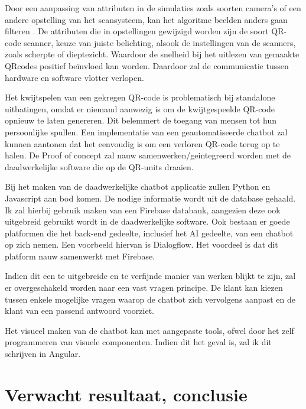 \documentclass[dutch,dit,thesis]{hogentreport}
\begin{document}
Door een aanpassing van attributen in de simulaties zoals soorten camera’s of een andere opstelling van het scansysteem, kan het algoritme beelden anders gaan filteren \autocite{Girisha2022}. De attributen die in opstellingen gewijzigd worden zijn de soort QR-code scanner, keuze van juiste belichting, alsook de instellingen van de scanners, zoals scherpte of dieptezicht. Waardoor de snelheid bij het uitlezen van gemaakte QRcodes positief beïnvloed kan worden. Daardoor zal de communicatie tussen hardware en software vlotter verlopen. 

Het kwijtspelen van een gekregen QR-code is problematisch bij standalone uitbatingen, omdat er niemand aanwezig is om de kwijtgespeelde QR-code opnieuw te laten genereren. Dit belemmert de toegang van mensen tot hun persoonlijke spullen. Een implementatie van een geautomatiseerde chatbot zal kunnen aantonen dat het eenvoudig is om een verloren QR-code terug op te halen. De Proof of concept zal nauw samenwerken/geintegreerd worden met de daadwerkelijke software die op de QR-units draaien.

Bij het maken van de daadwerkelijke chatbot applicatie zullen Python en Javascript aan bod komen. De nodige informatie wordt uit de database gehaald. Ik zal hierbij gebruik maken van een Firebase databank, aangezien deze ook uitgebreid gebruikt wordt in de daadwerkelijke software. Ook bestaan er goede platformen die het back-end gedeelte, inclusief het AI gedeelte, van een chatbot op zich nemen. Een voorbeeld hiervan is Dialogflow. \autocite{Cloud} Het voordeel is dat dit platform nauw samenwerkt met Firebase.

Indien dit een te uitgebreide en te verfijnde manier van werken blijkt te zijn, zal er overgeschakeld worden naar een vast vragen principe. De klant kan kiezen tussen enkele mogelijke vragen waarop de chatbot zich vervolgens aanpast en de klant van een passend antwoord voorziet.

Het visueel maken van de chatbot kan met aangepaste tools, ofwel door het zelf programmeren van visuele componenten. Indien dit het geval is, zal ik dit schrijven in Angular.





\section{Verwacht resultaat, conclusie}%
\label{sec:verwachte_resultaten}
\end{document}
